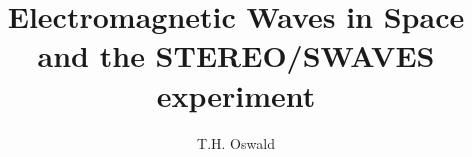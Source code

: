 \documentclass[a4paper,10pt]{book}
\begin{document}
\title{Electromagnetic Waves in Space and the STEREO/SWAVES experiment}
\author{T.H. Oswald}
\end{document}
